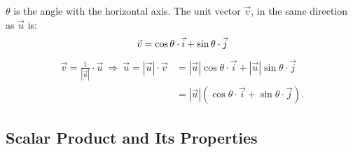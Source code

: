 \documentclass[12pt, a4paper]{article}
\begin{document}
\begin{enumerate}
\begin{figure}[H]
  \end{figure}
  $\theta$ is the angle with the horizontal axis. The unit vector $\vec{v}$, in the same direction as $\vec{u}$ is: 
  $$\vec{v}=\cos\theta\cdot\vec{i}+\sin\theta\cdot\vec{j}\\$$
  $$\begin{aligned}
    \vec{v}=\frac{1}{\left|\vec{u}\right|}\cdot\vec{u}\ \Rightarrow\ \vec{u}=\left|\vec{u}\right|\cdot\vec{v}&=\left|\vec{u}\right|\cos\theta\cdot\vec{i}+\left|\vec{u}\right|\sin\theta\cdot\vec{j}\\
    &=\left|\vec{u}\right|\left(\cos\theta\cdot\vec{i}+\sin\theta\cdot\vec{j}\right).
  \end{aligned}$$
\end{enumerate}

\subsection{Scalar Product and Its Properties}
\end{document}
